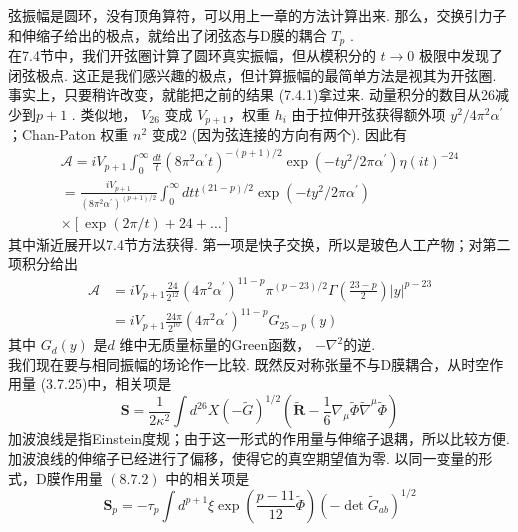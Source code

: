 弦振幅是圆环，没有顶角算符，可以用上一章的方法计算出来. 那么，交换引力子和伸缩子给出的极点，就给出了闭弦态与D膜的耦合 $T_{p}$ .\\
在7.4节中，我们开弦圈计算了圆环真实振幅，但从模积分的 $t \rightarrow 0$ 极限中发现了闭弦极点. 这正是我们感兴趣的极点，但计算振幅的最简单方法是视其为开弦圈. 事实上，只要稍许改变，就能把之前的结果 (7.4.1)拿过来. 动量积分的数目从26减少到$p+1$ . 类似地， $V_{26}$ 变成 $V_{p+1} $，权重 $h_{i}$ 由于拉伸开弦获得额外项 $y^{2} / 4 \pi^{2} \alpha^{\prime}$ ；Chan-Paton 权重 $n^{2}$ 变成2 (因为弦连接的方向有两个). 因此有
\begin{equation}
	\begin{aligned}
		\mathscr{A}=i V_{p+1} \int_{0}^{\infty} \frac{d t}{t}\left(8 \pi^{2} \alpha^{\prime} t\right)^{-(p+1) / 2} \exp \left(-t y^{2} / 2 \pi \alpha^{\prime}\right) \eta(i t)^{-24} \\
		=\frac{i V_{p+1}}{\left(8 \pi^{2} \alpha^{\prime}\right)^{(p+1) / 2}} \int_{0}^{\infty} d t t^{(21-p) / 2} \exp \left(-t y^{2} / 2 \pi \alpha^{\prime}\right) \\
		\times[\exp (2 \pi / t)+24+\ldots]
	\end{aligned}
\end{equation}
其中渐近展开以7.4节方法获得. 第一项是快子交换，所以是玻色人工产物；对第二项积分给出
\begin{equation}
	\begin{aligned}
		\mathscr{A} &=i V_{p+1} \frac{24}{2^{12}}\left(4 \pi^{2} \alpha^{\prime}\right)^{11-p} \pi^{(p-23) / 2} \Gamma\left(\frac{23-p}{2}\right)|y|^{p-23} \\
		&=i V_{p+1} \frac{24 \pi}{2^{10}}\left(4 \pi^{2} \alpha^{\prime}\right)^{11-p} G_{25-p}(y)
	\end{aligned}
\end{equation}
其中 $G_{d}(y)$ 是$d$ 维中无质量标量的Green函数， $-\nabla^{2}$的逆.\\
我们现在要与相同振幅的场论作一比较. 既然反对称张量不与D膜耦合，从时空作用量 (3.7.25)中，相关项是
\begin{equation}
	\boldsymbol{S}=\frac{1}{2 \kappa^{2}} \int d^{26} X(-\tilde{G})^{1 / 2}\left(\tilde{\boldsymbol{R}}-\frac{1}{6} \nabla_{\mu} \tilde{\Phi} \tilde{\nabla}^{\mu} \tilde{\Phi}\right)
\end{equation}
加波浪线是指Einstein度规；由于这一形式的作用量与伸缩子退耦，所以比较方便. 加波浪线的伸缩子已经进行了偏移，使得它的真空期望值为零. 以同一变量的形式，D膜作用量 $(8.7 .2)$ 中的相关项是
\begin{equation}
	\boldsymbol{S}_{p}=-\tau_{p} \int d^{p+1} \xi \exp \left(\frac{p-11}{12} \tilde{\Phi}\right)\left(-\operatorname{det} \tilde{G}_{a b}\right)^{1 / 2}
\end{equation}

